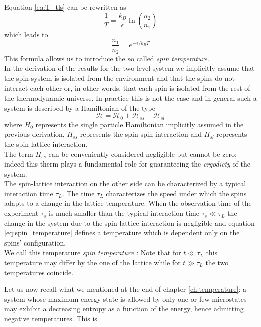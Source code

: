 Equation \ref{eq:T_tls} can be rewritten as
\begin{equation*}
    \frac{1}{T} = \frac{k_B}{\epsilon} \ln\left(\frac{n_2}{n_1}\right)
\end{equation*}
which leads to 
\begin{equation}
    \frac{n_1}{n_2} = e^{-\epsilon/k_BT}
    \label{eq:spin_temperature}
\end{equation}
This formula allows us to introduce the so called \emph{spin temperature}. \\
In the derivation of the results for the two level system we implicitly assume that the spin system is
isolated from the environment and that the spins do not interact each other or, in other words, that each spin is isolated from the rest of the thermodynamic universe.
In practice this is not the case and in general such a system is described by a Hamiltonian of the type
\begin{equation}
    \mathcal{H} = \mathcal{H}_0 + \mathcal{H}_{ss} + \mathcal{H}_{sl}
    \label{eq:Hamiltonian_lattice_spin}
\end{equation}
where $H_0$ represents the single particle Hamiltonian implicitly assumed in the previous derivation, $H_{ss}$ represents the spin-spin interaction and $H_{sl}$ represents the spin-lattice interaction. \\
The term $H_{ss}$ can be conveniently considered negligible but cannot be zero: indeed this therm plays a fundamental role for guaranteeing the \emph{ergodicty} of the system. \\
The spin-lattice interaction on the other side can be characterized by a typical interaction time $\tau_L$. The time $\tau_L$ characterizes the speed under which the spins adapts to a change in the lattice temperature. 
When the observation time of the experiment $\tau_s$ is much smaller than the typical interaction time $\tau_s \ll \tau_L$ the change in the system due to the spin-lattice interaction is negligible and equation \ref{eq:spin_temperature} defines a temperature which is dependent only on the spins' configuration. \\
We call this temperature \emph{spin temperature} \cite{Spin_temperature}: Note that for $t\ll \tau_L$ this temperature may differ by the one of the lattice while for $t \gg \tau_L$ the two temperatures coincide. \par
\vspace{10pt}
Let us now recall what we mentioned at the end of chapter \ref{ch:temperature}: a system whose maximum energy state is allowed by only one or few microstates may exhibit a decreasing entropy as a function of the energy, hence admitting negative temperatures. This is 
